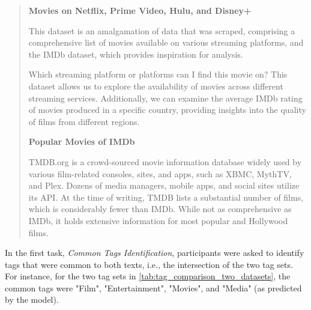 \begin{quote}
    \textbf{Movies on Netflix, Prime Video, Hulu, and Disney+}

    This dataset is an amalgamation of data that was scraped, comprising a comprehensive list of movies available on various streaming platforms, and the IMDb dataset, which provides inspiration for analysis.

    Which streaming platform or platforms can I find this movie on? This dataset allows us to explore the availability of movies across different streaming services. Additionally, we can examine the average IMDb rating of movies produced in a specific country, providing insights into the quality of films from different regions.

    \textbf{Popular Movies of IMDb}

    TMDB.org is a crowd-sourced movie information database widely used by various film-related consoles, sites, and apps, such as XBMC, MythTV, and Plex. Dozens of media managers, mobile apps, and social sites utilize its API. At the time of writing, TMDB lists a substantial number of films, which is considerably fewer than IMDb. While not as comprehensive as IMDb, it holds extensive information for most popular and Hollywood films.
\end{quote}

In the first task, \textit{Common Tags Identification}, participants were asked to identify tags that were common to both texts, i.e., the intersection of the two tag sets. For instance, for the two tag sets in \cref{tab:tag_comparison_two_datasets}, the common tags were "Film", "Entertainment", "Movies", and "Media" (as predicted by the model).

